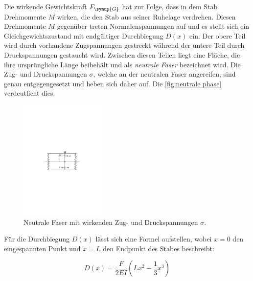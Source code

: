 Die wirkende Gewichtskraft $F_{\symup{G}}$ hat zur Folge, dass in dem Stab Drehmomente $M$ wirken, die den Stab aus seiner 
Ruhelage verdrehen. Diesen Drehmomente $M$ gegenüber treten Normalenspannungen auf und es stellt sich ein 
Gleichgewichtszustand mit endgültiger Durchbiegung $D(x)$ ein. Der obere Teil wird durch vorhandene Zugspannungen 
gestreckt während der untere Teil durch Druckspannungen gestaucht wird. Zwischen diesen Teilen liegt eine Fläche, die 
ihre ursprüngliche Länge beibehält und als \textit{neutrale Faser} bezeichnet wird. Die Zug- und Druckspannungen $\sigma$, 
welche an der neutralen Faser angereifen, sind genau entgegengesetzt und heben sich daher auf. 
Die \autoref{fig:neutrale phase} verdeutlicht dies.

\begin{figure} [H]
    \centering
    \includegraphics[height=6cm]{content/Abbildungen/neutrale_phase.pdf}
    \caption{Neutrale Faser mit wirkenden Zug- und Druckspannungen $\sigma$. \cite{v103}}
    \label{fig:neutrale phase}
\end{figure}


Für die Durchbiegung $D(x)$ lässt sich eine Formel aufstellen, wobei $x=0$ den eingespannten Punkt
und $x=L$ den Endpunkt des Stabes beschreibt:

\begin{equation}
    D(x)=\frac{F}{2EI}(Lx^{2}-\frac{1}{3}x^{3})
    \label{eq:Durchbiegung einseitig}
\end{equation}

